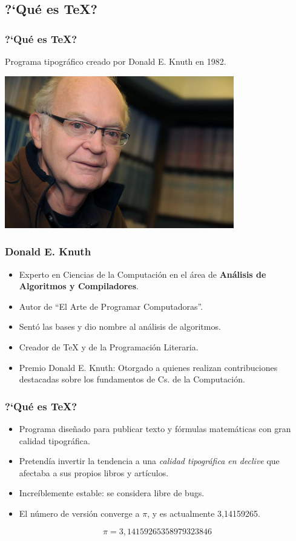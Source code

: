 \documentclass[aspectratio=43]{beamer}%
\newcommand\azul[1]{\textcolor[RGB]{19,15,204}{#1}}
\begin{document}
\subsection{?`Qué es \TeX{}?}
\begin{frame}[fragile]
\frametitle{\textbf{?`Qué es \TeX{}?}}
\justifying
 Programa tipográfico creado por Donald E. Knuth en 1982.
 \begin{center}
\includegraphics[width=10cm]{images/d_knuth_noticia}
\end{center}
\end{frame}

\begin{frame}[fragile]
\frametitle{\textbf{Donald E. Knuth}}
\justifying
 \begin{itemize}\justifying
  \item Experto en Ciencias de la Computación en el área de \textbf{Análisis de Algoritmos y Compiladores}.
  \item Autor de ``El Arte de Programar Computadoras''.
  \item Sentó las bases y dio nombre al análisis de algoritmos.
  \item Creador de \TeX{} y de la Programación Literaria.
  \item \azul{Premio Donald E. Knuth}: Otorgado a quienes realizan contribuciones destacadas sobre los fundamentos de Cs. de la Computación.
\end{itemize}

\end{frame}

\begin{frame}[fragile]
\frametitle{\textbf{?`Qué es \TeX{}?}}
\justifying
 \begin{itemize}\justifying
  \item Programa diseñado para publicar texto y fórmulas matemáticas con gran calidad tipográfica.
  \item Pretendía invertir la tendencia a una \textit{calidad tipográfica en declive} que afectaba a sus propios libros y artículos.
  \item Increíblemente estable: se considera libre de bugs.
  \item El número de versión converge a $\pi$, y es actualmente 3,14159265.
\end{itemize}
\[\pi= 3,14159265358979323846\]
\end{frame}
\end{document}
